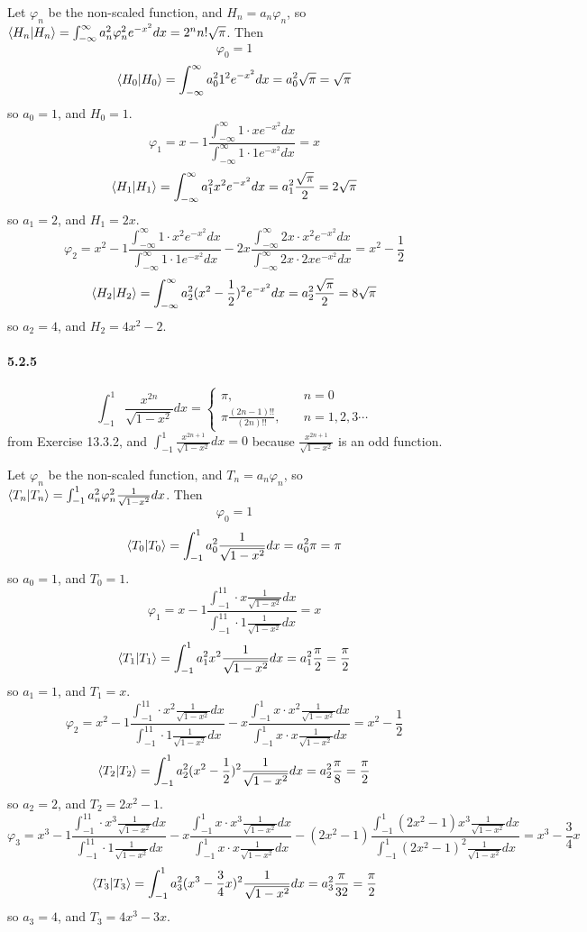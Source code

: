\documentclass[a4paper]{article}
\begin{document}
Let $\varphi_n$ be the non-scaled function, and $H_n=a_n\varphi_n$, so $\langle H_n|H_n\rangle=\int_{-\infty}^\infty a_n^2\varphi_n^2e^{-x^2}dx=2^nn!\sqrt{\pi}$. Then
\[
\varphi_0=1
\]
\[
\langle H_0|H_0\rangle=\int_{-\infty}^\infty a_0^21^2e^{-x^2}dx=a_0^2\sqrt{\pi}=\sqrt{\pi}
\]
so $a_0=1$, and $H_0=1$.
\[
\varphi_1=x-1\frac{\int_{-\infty}^\infty1\cdot xe^{-x^2}dx}{\int_{-\infty}^\infty1\cdot1e^{-x^2}dx}=x
\]
\[
\langle H_1|H_1\rangle=\int_{-\infty}^\infty a_1^2x^2e^{-x^2}dx=a_1^2\frac{\sqrt{\pi}}{2}=2\sqrt{\pi}
\]
so $a_1=2$, and $H_1=2x$.
\[
\varphi_2=x^2-1\frac{\int_{-\infty}^\infty1\cdot x^2e^{-x^2}dx}{\int_{-\infty}^\infty1\cdot1e^{-x^2}dx}-2x\frac{\int_{-\infty}^\infty2x\cdot x^2e^{-x^2}dx}{\int_{-\infty}^\infty2x\cdot2xe^{-x^2}dx}=x^2-\frac{1}{2}
\]
\[
\langle H_2|H_2\rangle=\int_{-\infty}^\infty a_2^2(x^2-\frac{1}{2})^2e^{-x^2}dx=a_2^2\frac{\sqrt{\pi}}{2}=8\sqrt{\pi}
\]
so $a_2=4$, and $H_2=4x^2-2$.

\paragraph{5.2.5}
\[
\int_{-1}^1\frac{x^{2n}}{\sqrt{1-x^2}}dx=
\begin{cases}
\pi,\quad &n=0\\
\pi\frac{(2n-1)!!}{(2n)!!},\quad &n=1,2,3\cdots
\end{cases}
\]
from Exercise 13.3.2, and $\int_{-1}^1\frac{x^{2n+1}}{\sqrt{1-x^2}}dx=0$ because $\frac{x^{2n+1}}{\sqrt{1-x^2}}$ is an odd function.
\medskip

Let $\varphi_n$ be the non-scaled function, and
$T_n=a_n\varphi_n$, so $\langle T_n|T_n\rangle=\int_{-1}^1a_n^2\varphi_n^2\frac{1}{\sqrt{1-x^2}}dx$. Then
\[
\varphi_0=1
\]
\[
\langle T_0|T_0\rangle=\int_{-1}^1a_0^2\frac{1}{\sqrt{1-x^2}}dx=a_0^2\pi=\pi
\]
so $a_0=1$, and $T_0=1$.
\[
\varphi_1=x-1\frac{\int_{-1}^11\cdot x\frac{1}{\sqrt{1-x^2}}dx}{\int_{-1}^11\cdot1\frac{1}{\sqrt{1-x^2}}dx}=x
\]
\[
\langle T_1|T_1\rangle=\int_{-1}^1a_1^2x^2\frac{1}{\sqrt{1-x^2}}dx=a_1^2\frac{\pi}{2}=\frac{\pi}{2}
\]
so $a_1=1$, and $T_1=x$.
\[
\varphi_2=x^2-1\frac{\int_{-1}^11\cdot x^2\frac{1}{\sqrt{1-x^2}}dx}{\int_{-1}^11\cdot1\frac{1}{\sqrt{1-x^2}}dx}-x\frac{\int_{-1}^1x\cdot x^2\frac{1}{\sqrt{1-x^2}}dx}{\int_{-1}^1x\cdot x\frac{1}{\sqrt{1-x^2}}dx}=x^2-\frac{1}{2}
\]
\[
\langle T_2|T_2\rangle=\int_{-1}^1a_2^2(x^2-\frac{1}{2})^2\frac{1}{\sqrt{1-x^2}}dx=a_2^2\frac{\pi}{8}=\frac{\pi}{2}
\]
so $a_2=2$, and $T_2=2x^2-1$.
\[
\varphi_3=x^3-1\frac{\int_{-1}^11\cdot x^3\frac{1}{\sqrt{1-x^2}}dx}{\int_{-1}^11\cdot1\frac{1}{\sqrt{1-x^2}}dx}-x\frac{\int_{-1}^1x\cdot x^3\frac{1}{\sqrt{1-x^2}}dx}{\int_{-1}^1x\cdot x\frac{1}{\sqrt{1-x^2}}dx}-(2x^2-1)\frac{\int_{-1}^1(2x^2-1)x^3\frac{1}{\sqrt{1-x^2}}dx}{\int_{-1}^1(2x^2-1)^2\frac{1}{\sqrt{1-x^2}}dx}=x^3-\frac{3}{4}x
\]
\[
\langle T_3|T_3\rangle=\int_{-1}^1a_3^2(x^3-\frac{3}{4}x)^2\frac{1}{\sqrt{1-x^2}}dx=a_3^2\frac{\pi}{32}=\frac{\pi}{2}
\]
so $a_3=4$, and $T_3=4x^3-3x$.
\end{document}

